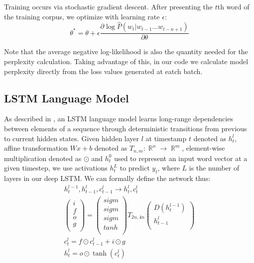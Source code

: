 \documentclass[11pt]{article}
\DeclareMathOperator*{\R}{\mathbb{R}}
\begin{document}
Training occurs via stochastic gradient descent. After presenting the $t$th word of the training corpus, we optimize with learning rate $\epsilon$:
$$\theta^{*} = \theta + \epsilon \frac{\partial \log \hat{P}(w_t|w_{t-1}...w_{t-n+1})}{\partial \theta}$$

Note that the average negative log-likelihood is also the quantity needed for the perplexity calculation. Taking advantage of this, in our code we calculate model perplexity directly from the loss values generated at eatch batch.

\subsection{LSTM Language Model}

As described in \cite{zaremba2014recurrent}, an LSTM language model learns long-range dependencies between elements of a sequence through deterministic transitions from previous to current hidden states. Given hidden layer $l$ at timestamp $t$ denoted as $h_t^{l}$, affine transformation $Wx+b$ denoted as $T_{n,m}: \R^n \rightarrow \R^m$, element-wise multiplication denoted as $\odot$ and $h_t^0$ used to represent an input word vector at a given timestep, we use activations $h_t^{L}$ to predict $y_t$, where $L$ is the number of layers in our deep LSTM. We can formally define the network thus:
\begin{align*}
  h_t^{l-1},h_{t-1}^{l},c_{t-1}^{l} \rightarrow h_t^l, c_t^l \\
  \begin{pmatrix}
    i \\
    f \\
    o \\
    g \\
  \end{pmatrix} = 
  \begin{pmatrix}
    sigm \\
    sigm \\
    sigm \\
    tanh \\
  \end{pmatrix} T_{2n,4n} \begin{pmatrix}
    D(h_t^{l-1}) \\
    h_{t-1}^l \\
  \end{pmatrix}
  \\
  c_t^l = f \odot c_{t-1}^{l} + i \odot g \\
  h_t^l = o \odot \tanh(c_t^l)
\end{align*}
\end{document}
